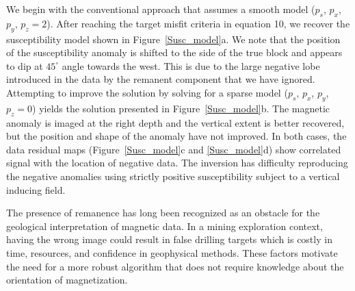 \documentclass[paper]{geophysics}
\begin{document}
We begin with the conventional approach that assumes a smooth model ($p_s$, $p_x$, $p_y$, $p_z = 2$). After reaching the target misfit criteria in equation 10, we recover the susceptibility model shown in Figure~\ref{Susc_model}a. We note that the position of the susceptibility anomaly is shifted to the side of the true block and appears to dip at $45^\circ$ angle towards the west. This is due to the large negative lobe introduced in the data by the remanent component that we have ignored. Attempting to improve the solution by solving for a sparse model ($p_s$, $p_x$, $p_y$, $p_z = 0$) yields the solution presented in Figure~\ref{Susc_model}b. The magnetic anomaly is imaged at the right depth and the vertical extent is better recovered, but the position and shape of the anomaly have not improved. In both cases, the data residual maps (Figure~\ref{Susc_model}c and \ref{Susc_model}d) show correlated signal with the location of negative data. The inversion has difficulty reproducing the negative anomalies using strictly positive susceptibility subject to a vertical inducing field.

The presence of remanence has long been recognized as an obstacle for the geological interpretation of magnetic data.
In a mining exploration context, having the wrong image could result in false drilling targets which is costly in time, resources, and confidence in geophysical methods.
These factors motivate the need for a more robust algorithm that does not require knowledge about the orientation of magnetization.
\end{document}
